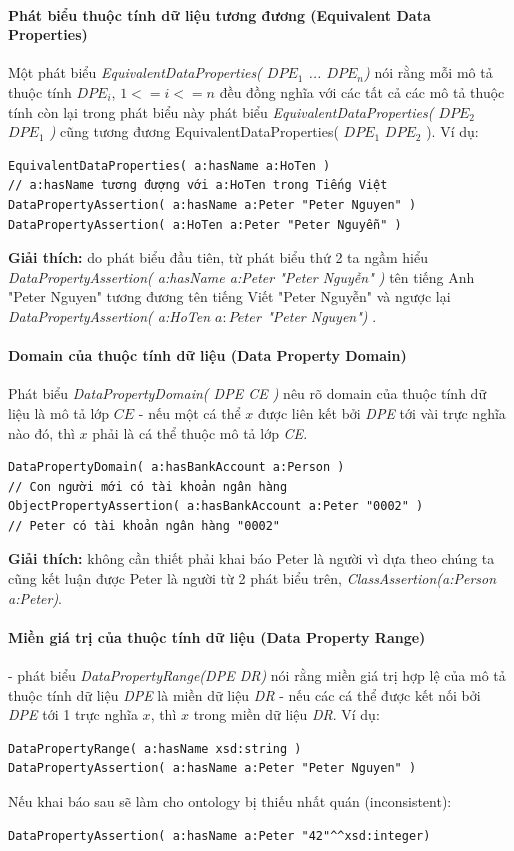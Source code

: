 \paragraph{Phát biểu thuộc tính dữ liệu tương đương (Equivalent Data Properties)} Một phát biểu \textit{EquivalentDataProperties( $DPE_{1}$ ... $DPE_{n}$)} nói rằng mỗi mô tả thuộc tính $DPE_{i}$, $1<=i<=n$ đều đồng nghĩa với các tất cả các mô tả thuộc tính còn lại trong phát biểu này phát biểu \textit{EquivalentDataProperties( $DPE_{2}$ $DPE_{1}$ )} cũng tương đương EquivalentDataProperties( $DPE_{1}$ $DPE_{2}$ ). Ví dụ:
\begin{verbatim}
EquivalentDataProperties( a:hasName a:HoTen ) 
// a:hasName tương đượng với a:HoTen trong Tiếng Việt
DataPropertyAssertion( a:hasName a:Peter "Peter Nguyen" )
DataPropertyAssertion( a:HoTen a:Peter "Peter Nguyễn" )
\end{verbatim}
\textbf{Giải thích:} do phát biểu đầu tiên, từ phát biểu thứ 2 ta ngầm hiểu \textit{DataPropertyAssertion( a:hasName a:Peter "Peter Nguyễn" )} tên tiếng Anh "Peter Nguyen" tương đương tên tiếng Viết "Peter Nguyễn" và ngược lại \textit{DataPropertyAssertion( a:HoTen $a:Peter$ "Peter Nguyen") }.

\paragraph{Domain của thuộc tính dữ liệu (Data Property Domain)} Phát biểu \textit{DataPropertyDomain( DPE CE )} nêu rõ domain của thuộc tính dữ liệu là mô tả lớp $CE$ -  nếu một cá thể $x$ được liên kết bởi \textit{DPE} tới vài trực nghĩa nào đó, thì $x$ phải là cá thể thuộc mô tả lớp \textit{CE}.
\begin{verbatim}
DataPropertyDomain( a:hasBankAccount a:Person ) 
// Con người mới có tài khoản ngân hàng
ObjectPropertyAssertion( a:hasBankAccount a:Peter "0002" ) 
// Peter có tài khoản ngân hàng "0002"
\end{verbatim}
\textbf{Giải thích:} không cần thiết phải khai báo Peter là người vì dựa theo chúng ta cũng kết luận được Peter là người từ 2 phát biểu trên, \textit{ClassAssertion(a:Person a:Peter)}.

\paragraph{Miền giá trị của thuộc tính dữ liệu (Data Property Range)} - phát biểu \textit{DataPropertyRange(DPE DR)} nói rằng miền giá trị hợp lệ của mô tả thuộc tính dữ liệu \textit{DPE} là miền dữ liệu \textit{DR} - nếu các cá thể được kết nối bởi \textit{DPE} tới 1 trực nghĩa $x$, thì $x$ trong miền dữ liệu \textit{DR}. Ví dụ:
\begin{verbatim}
DataPropertyRange( a:hasName xsd:string )
DataPropertyAssertion( a:hasName a:Peter "Peter Nguyen" )
\end{verbatim}
Nếu khai báo sau sẽ làm cho ontology bị thiếu nhất quán (inconsistent):
\begin{verbatim}
DataPropertyAssertion( a:hasName a:Peter "42"^^xsd:integer)
\end{verbatim}

